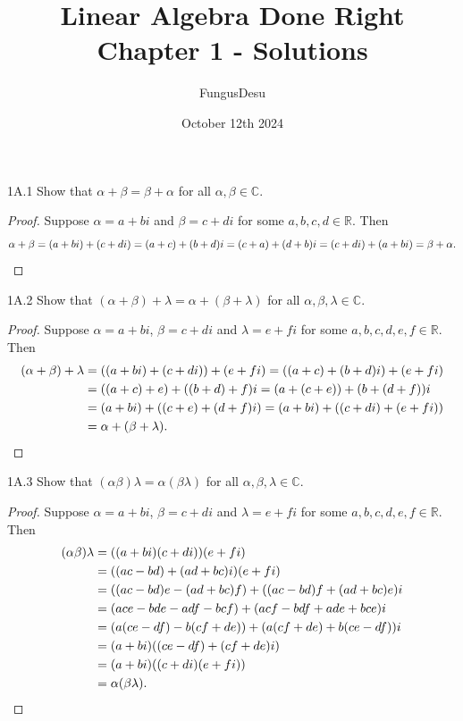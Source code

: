 \documentclass{exam}
\title{Linear Algebra Done Right Chapter 1 - Solutions}
\author{FungusDesu}
\date{October 12th 2024}
\begin{document}
\maketitle

\begin{problem}{1A.1}
    Show that $\alpha + \beta = \beta + \alpha$ for all $\alpha,\beta\in\mathbb C$.
\end{problem}

\begin{proof}
    Suppose $\alpha = a + bi$ and $\beta = c + di$ for some $a,b,c,d\in\mathbb R$. Then \[
        \alpha + \beta = (a + bi) + (c + di) = (a + c) + (b+d)i = (c + a) + (d + b)i = (c + di) + (a + bi) = \beta + \alpha. \qedhere
    \]
\end{proof}

\begin{problem}{1A.2}
    Show that $(\alpha + \beta) + \lambda = \alpha + (\beta + \lambda)$ for all $\alpha, \beta, \lambda\in\mathbb C$.
\end{problem}

\begin{proof}
    Suppose $\alpha = a + bi$, $\beta = c + di$ and $\lambda = e + fi$ for some $a,b,c,d,e,f\in\mathbb R$. Then
    \begin{align*}
        (\alpha + \beta) + \lambda &= ((a + bi) + (c+di)) + (e + fi) = ((a + c) + (b + d)i) + (e + fi)\\
        &= ((a + c) + e) + ((b + d) + f)i = (a + (c + e)) + (b + (d + f))i\\
        &= (a + bi) + ((c + e) + (d + f)i) = (a + bi) + ((c + di) + (e + fi))\\
        &= \alpha + (\beta + \lambda).\qedhere
    \end{align*}
\end{proof}

\begin{problem}{1A.3}
    Show that $(\alpha\beta)\lambda = \alpha(\beta\lambda)$ for all $\alpha,\beta,\lambda\in\mathbb C$.
\end{problem}

\begin{proof}
    Suppose $\alpha = a + bi$, $\beta = c + di$ and $\lambda = e + fi$ for some $a,b,c,d,e,f\in\mathbb R$. Then
    \begin{align*}
        (\alpha\beta)\lambda &= ((a+bi)(c+di))(e+fi)\\ 
        &= ((ac-bd) + (ad + bc)i)(e + fi)\\
        &= ((ac-bd)e - (ad+bc)f) + ((ac-bd)f + (ad+bc)e)i\\
        &=(ace - bde - adf - bcf) + (acf-bdf+ade+bce)i\\
        &=(a(ce - df) - b(cf + de)) + (a(cf + de) + b(ce - df))i\\
        &=(a+bi)((ce-df)+(cf+de)i)\\
        &=(a+bi)((c+di)(e+fi))\\
        &=\alpha(\beta\lambda).\qedhere
    \end{align*}
\end{proof}
\end{document}
